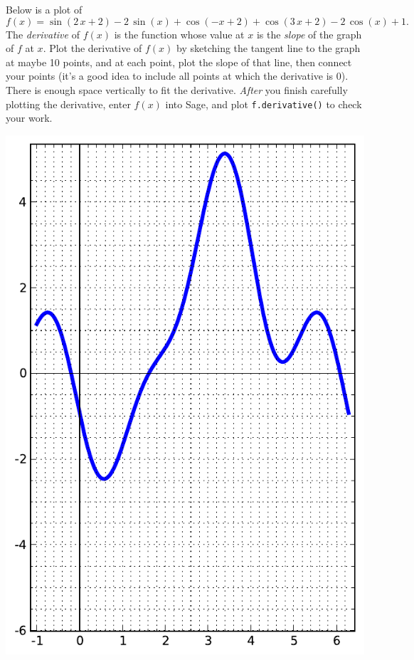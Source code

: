 Below is a plot of $$f(x)=\sin\left(2 \, x + 2\right) - 2 \, \sin\left(x\right) + \cos\left(-x + 2\right) + \cos\left(3 \, x + 2\right) - 2 \, \cos\left(x\right) + 1.$$  The {\em \color{red}derivative} of $f(x)$ is the function whose value at $x$ is the {\em slope} of the graph of $f$ at $x$.  Plot the derivative of $f(x)$ by sketching the tangent line to the graph at maybe 10 points, and at each point, plot the slope of that line, then connect your points (it's a good idea to include all points at which the derivative is 0).  There is enough space vertically to fit the derivative.  {\em After} you finish carefully plotting the derivative, enter $f(x)$ into Sage, and plot {\color{blue}\verb|f.derivative()|} to check your work.
\begin{center}\includegraphics{functions/76.pdf}\end{center}\newpage

